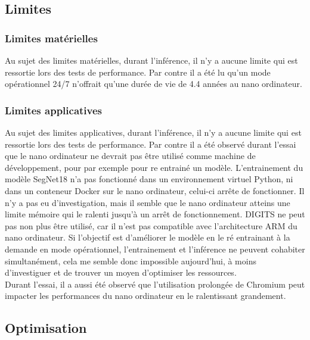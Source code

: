 \subsection{Limites}
\subsubsection{Limites matérielles}
\noindent Au sujet des limites matérielles, durant l'inférence, il n'y a aucune limite qui est ressortie lors des tests de performance. Par contre il a été lu qu'un mode opérationnel 24/7 n'offrait qu'une durée de vie de 4.4 années au nano ordinateur. 
\subsubsection{Limites applicatives}
\noindent Au sujet des limites applicatives, durant l'inférence, il n'y a aucune limite qui est ressortie lors des tests de performance. Par contre il a été observé durant l'essai que le nano ordinateur ne devrait pas être utilisé comme machine de développement, pour par exemple pour re entrainé un modèle. L'entrainement du modèle SegNet18 n'a pas fonctionné dans un environnement virtuel Python, ni dans un conteneur Docker sur le nano ordinateur, celui-ci arrête de fonctionner. Il n'y a pas eu d'investigation, mais il semble que le nano ordinateur atteins une limite mémoire qui le ralenti jusqu'à un arrêt de fonctionnement. DIGITS ne peut pas non plus être utilisé, car il n'est pas compatible avec l'architecture ARM du nano ordinateur. Si l'objectif est d'améliorer le modèle en le ré entrainant à la demande en mode opérationnel, l'entrainement et l'inférence ne peuvent cohabiter simultanément, cela me semble donc impossible aujourd'hui, à moins d'investiguer et de trouver un moyen d'optimiser les ressources.
\vspace{\baselineskip}
\\
\noindent Durant l'essai, il a aussi été observé que l'utilisation prolongée de Chromium peut impacter les performances du nano ordinateur en le ralentissant grandement. 
\subsection{Optimisation}
